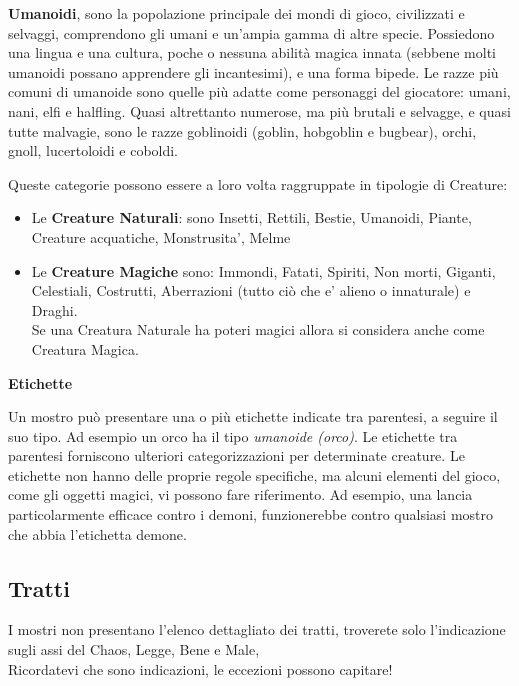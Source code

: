 \medskip\textbf{Umanoidi}, sono la popolazione principale dei mondi di gioco, civilizzati e selvaggi, comprendono gli umani e un'ampia gamma di altre specie. Possiedono una lingua e una cultura, poche o nessuna abilità magica innata (sebbene molti umanoidi possano apprendere gli incantesimi), e una forma bipede. Le razze più comuni di umanoide sono quelle più adatte come personaggi del giocatore: umani, nani, elfi e halfling. Quasi altrettanto numerose, ma più brutali e selvagge, e quasi tutte malvagie, sono le razze goblinoidi (goblin, hobgoblin e bugbear), orchi, gnoll, lucertoloidi e coboldi.\\

\medskip

Queste categorie possono essere a loro volta raggruppate in tipologie di Creature:
\smallskip
\begin{itemize}
\item
Le \textbf{Creature Naturali}: sono Insetti, Rettili, Bestie, Umanoidi, Piante, Creature acquatiche, Monstrusita', Melme
\item
Le \textbf{Creature Magiche} sono: Immondi, Fatati, Spiriti, Non morti, Giganti, Celestiali, Costrutti, Aberrazioni (tutto ciò che e' alieno o innaturale) e Draghi.\\
Se una Creatura Naturale ha poteri magici allora si considera anche come Creatura Magica.
\end{itemize}


\medskip\textbf{Etichette}

Un mostro può presentare una o più etichette indicate tra parentesi, a seguire il suo tipo. Ad esempio un orco ha il tipo \emph{umanoide (orco)}. Le etichette tra parentesi forniscono ulteriori categorizzazioni per determinate creature. Le etichette non hanno delle proprie regole specifiche, ma alcuni elementi del gioco, come gli oggetti magici, vi possono fare riferimento. Ad esempio, una lancia particolarmente efficace contro i demoni, funzionerebbe contro qualsiasi mostro che abbia l'etichetta demone.

\subsection{Tratti}

I mostri non presentano l'elenco dettagliato dei tratti, troverete solo l'indicazione sugli assi del Chaos, Legge, Bene e Male,\\
Ricordatevi che sono indicazioni, le eccezioni possono capitare!\\

